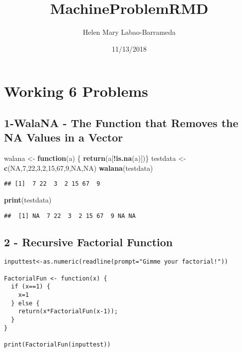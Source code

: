 \documentclass[]{article}
\title{MachineProblemRMD}
\author{Helen Mary Labao-Barrameda}
\date{11/13/2018}
\newenvironment{Shaded}{\begin{snugshade}}{\end{snugshade}}
\newcommand{\KeywordTok}[1]{\textcolor[rgb]{0.13,0.29,0.53}{\textbf{#1}}}
\newcommand{\DecValTok}[1]{\textcolor[rgb]{0.00,0.00,0.81}{#1}}
\newcommand{\StringTok}[1]{\textcolor[rgb]{0.31,0.60,0.02}{#1}}
\newcommand{\OtherTok}[1]{\textcolor[rgb]{0.56,0.35,0.01}{#1}}
\newcommand{\ControlFlowTok}[1]{\textcolor[rgb]{0.13,0.29,0.53}{\textbf{#1}}}
\newcommand{\OperatorTok}[1]{\textcolor[rgb]{0.81,0.36,0.00}{\textbf{#1}}}
\newcommand{\NormalTok}[1]{#1}
\begin{document}
\maketitle

\section{Working 6 Problems}\label{working-6-problems}

\subsection{1-WalaNA - The Function that Removes the NA Values in a
Vector}\label{walana---the-function-that-removes-the-na-values-in-a-vector}

\begin{Shaded}
\begin{Highlighting}[]
\NormalTok{walana <-}\StringTok{ }\ControlFlowTok{function}\NormalTok{(a) \{}
  \KeywordTok{return}\NormalTok{(a[}\OperatorTok{!}\KeywordTok{is.na}\NormalTok{(a)])\}}
\NormalTok{testdata <-}\StringTok{ }\KeywordTok{c}\NormalTok{(}\OtherTok{NA}\NormalTok{,}\DecValTok{7}\NormalTok{,}\DecValTok{22}\NormalTok{,}\DecValTok{3}\NormalTok{,}\DecValTok{2}\NormalTok{,}\DecValTok{15}\NormalTok{,}\DecValTok{67}\NormalTok{,}\DecValTok{9}\NormalTok{,}\OtherTok{NA}\NormalTok{,}\OtherTok{NA}\NormalTok{)}
\KeywordTok{walana}\NormalTok{(testdata)}
\end{Highlighting}
\end{Shaded}

\begin{verbatim}
## [1]  7 22  3  2 15 67  9
\end{verbatim}

\begin{Shaded}
\begin{Highlighting}[]
\KeywordTok{print}\NormalTok{(testdata)}
\end{Highlighting}
\end{Shaded}

\begin{verbatim}
##  [1] NA  7 22  3  2 15 67  9 NA NA
\end{verbatim}

\subsection{2 - Recursive Factorial
Function}\label{recursive-factorial-function}

\begin{verbatim}
inputtest<-as.numeric(readline(prompt="Gimme your factorial!"))

FactorialFun <- function(x) {
  if (x==1) {  
    x=1  
  } else {      
    return(x*FactorialFun(x-1));
  }
}

print(FactorialFun(inputtest))
\end{verbatim}
\end{document}
